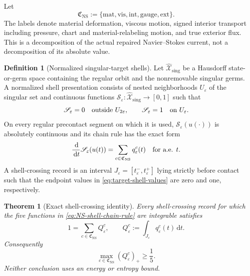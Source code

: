\documentclass[11pt]{amsart}
\numberwithin{equation}{section}
\theoremstyle{plain}
\newtheorem{theorem}{Theorem}[section]
\theoremstyle{definition}
\newtheorem{definition}[definition]{Definition}
\theoremstyle{remark}
\newcommand{\dd}{\,\mathrm d}
\begin{document}
Let
\begin{equation}\label{eq:NS-component-set}
 \mathfrak C_{\mathrm{NS}}
 :=\{\mathrm{mat},\mathrm{vis},\mathrm{int},\mathrm{gauge},\mathrm{ext}\}.
\end{equation}
The labels denote material deformation, viscous motion, signed interior
transport including pressure, chart and material-relabeling motion, and true
exterior flux.  This is a decomposition of the actual repaired
Navier--Stokes current, not a decomposition of its absolute value.

\begin{definition}[Normalized singular-target shells]
\label{def:normalized-target-shells}
Let \(\widehat{\mathcal X}_{\mathrm{sing}}\) be a Hausdorff state-or-germ
space containing the regular orbit and the nonremovable singular germs.  A
normalized shell presentation consists of nested neighborhoods
\(U_\varepsilon\) of the singular set and continuous functions
\(\mathscr S_\varepsilon:\widehat{\mathcal X}_{\mathrm{sing}}\to[0,1]\)
such that
\begin{equation}\label{eq:target-shell-values}
 \mathscr S_\varepsilon=0
 \quad\hbox{outside }U_{2\varepsilon},
 \qquad
 \mathscr S_\varepsilon=1
 \quad\hbox{on }U_\varepsilon.
\end{equation}
On every regular precontact segment on which it is used,
\(\mathscr S_\varepsilon(u(\cdot))\) is absolutely continuous and its chain
rule has the exact form
\begin{equation}\label{eq:NS-shell-chain-rule}
 \frac{\dd}{\dd t}\mathscr S_\varepsilon(u(t))
 =\sum_{c\in\mathfrak C_{\mathrm{NS}}}q^c_\varepsilon(t)
 \quad\hbox{for a.e. }t.
\end{equation}
A shell-crossing record is an interval
\(J_\varepsilon=[t^-_\varepsilon,t^+_\varepsilon]\) lying strictly before
contact such that the endpoint values in
\eqref{eq:target-shell-values} are zero and one, respectively.
\end{definition}

\begin{theorem}[Exact shell-crossing identity]
\label{thm:NS-shell-identity}
Every shell-crossing record for which the five functions in
\eqref{eq:NS-shell-chain-rule} are integrable satisfies
\begin{equation}\label{eq:NS-unit-shell-progress}
 1=\sum_{c\in\mathfrak C_{\mathrm{NS}}}Q^c_\varepsilon,
 \qquad
 Q^c_\varepsilon:=\int_{J_\varepsilon}q^c_\varepsilon(t)\dd t.
\end{equation}
Consequently
\begin{equation}\label{eq:NS-positive-shell-component}
 \max_{c\in\mathfrak C_{\mathrm{NS}}}(Q^c_\varepsilon)_+
 \ge\frac15.
\end{equation}
Neither conclusion uses an energy or entropy bound.
\end{theorem}
\end{document}
